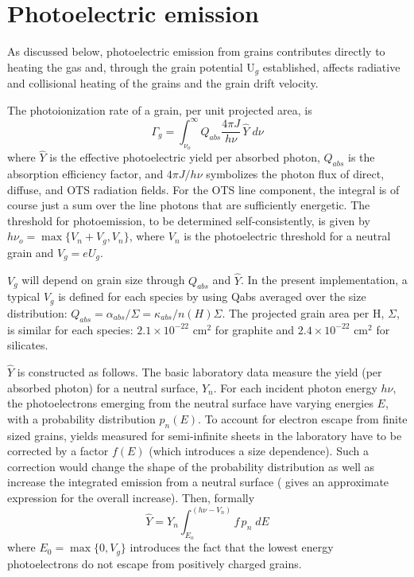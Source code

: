 \section{Photoelectric emission}

As discussed below, photoelectric emission from grains contributes
directly to heating the gas and, through the grain potential U$_g$ established,
affects radiative and collisional heating of the grains and the grain drift
velocity.

The photoionization rate of a grain, per unit projected area, is
\begin{equation}
{\Gamma _g} = \int_{{\nu _o}}^\infty  {{Q_{abs}}\frac{{4\pi J}}{{h\nu
}}\,\hat Y} \;d\nu
\end{equation}
where $\hat Y$ is the effective photoelectric yield per absorbed photon,
$Q_{abs}$ is the
absorption efficiency factor, and $4 \pi J/h\nu$ symbolizes the photon flux of
direct, diffuse, and OTS radiation fields.  For the OTS line component,
the integral is of course just a sum over the line photons that are
sufficiently energetic.  The threshold for photoemission, to be determined
self-consistently, is given by $h\nu_o = \max\{V_n+V_g, V_n\}$, where $V_n$ is the
photoelectric threshold for a neutral grain and $V_g = eU_g$.

$V_g$ will depend on grain size through $Q_{abs}$ and $\hat Y$.  In the
present implementation, a typical $V_g$ is defined for each species
by using Qabs averaged over the size distribution: $Q_{abs} =
\alpha_{abs}/\Sigma = \kappa_{abs}/n(H)\Sigma$.  The projected grain area
per H, $\Sigma$, is similar for each species: $2.1 \times 10^{-22}$
cm$^2$ for graphite and $2.4 \times 10^{-22}$ cm$^2$ for silicates.

$\hat Y$ is constructed as follows.
The basic laboratory data measure the yield
(per absorbed photon) for a neutral surface, $Y_n$.
For each incident photon
energy $h\nu$, the photoelectrons emerging from the neutral surface have varying
energies $E$, with a probability distribution $p_n(E)$.
To account for electron
escape from finite sized
grains, yields measured for semi-infinite sheets in the laboratory have
to be corrected by a factor $f(E)$ (which introduces a size dependence).
Such a correction would change the shape of the probability distribution
as well as increase the integrated emission from a neutral surface (\citealp{Draine1978} gives an approximate expression for the overall increase).  Then,
formally
\begin{equation}
\hat Y = {Y_n}\int_{{E_o}}^{\left( {h\nu  - {V_n}} \right)} {f\,{p_n}\;dE}
\end{equation}
where $E_0 = \max\{0 , V_g\}$ introduces the fact that the lowest energy
photoelectrons do not escape from positively charged grains.

